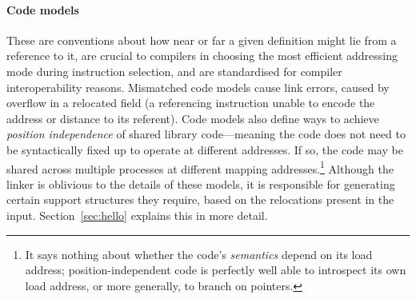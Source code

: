\paragraph{Code models} These are conventions about 
how near or far a given definition might lie from a reference to it, 
are crucial to compilers in choosing the most efficient addressing mode
during instruction selection, and are standardised for compiler interoperability reasons.
Mismatched code models cause link errors, caused by overflow in a relocated field 
(a referencing instruction unable to encode the address or distance to its referent).
Code models also define ways to achieve \emph{position independence} of shared library
code---meaning the code does not need to be syntactically
fixed up to operate at different addresses. If so, 
the code may be shared across multiple processes at different mapping addresses.\footnote{It says nothing about
whether the code's \emph{semantics} depend on its load address; 
position-independent code is perfectly well able to 
introspect its own load address, or more generally, to branch on pointers.}
Although the linker is oblivious to the details of these models, 
it is responsible for generating certain support structures they require,
based on the relocations present in the input.
Section~\ref{sec:hello} explains this in more detail.


